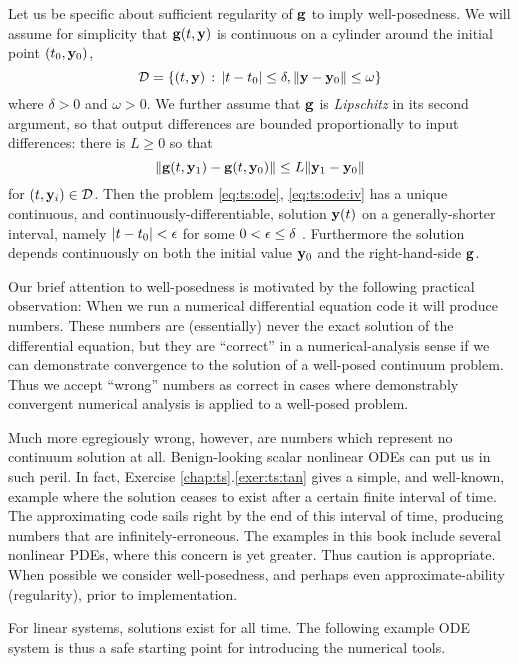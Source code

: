 Let us be specific about sufficient regularity of $\mathbf{g}$ to imply well-posedness.  We will assume for simplicity that $\mathbf{g}(t,\mathbf{y})$ is continuous on a cylinder around the initial point $(t_0,\mathbf{y}_0)$,
   $$\mathcal{D} = \{(t,\mathbf{y}) \,:\, |t-t_0| \le \delta, \|\mathbf{y} - \mathbf{y}_0\| \le \omega\}$$
where $\delta > 0$ and $\omega > 0$.  We further assume that $\mathbf{g}$ is \emph{Lipschitz} in its second argument, so that output differences are bounded proportionally to input differences: there is $L\ge 0$ so that
\begin{equation}
\|\mathbf{g}(t,\mathbf{y}_1) - \mathbf{g}(t,\mathbf{y}_0)\| \le L \|\mathbf{y}_1-\mathbf{y}_0\|  \label{eq:ts:glipschitz}
\end{equation}
for $(t,\mathbf{y}_i) \in \mathcal{D}$.  Then the problem \eqref{eq:ts:ode}, \eqref{eq:ts:ode:iv} has a unique continuous, and continuously-differentiable, solution $\mathbf{y}(t)$ on a generally-shorter interval, namely $|t-t_0|<\epsilon$ for some $0 < \epsilon \le \delta$ \citep[section 17.5]{HirschSmaleDevaney2004}.  Furthermore the solution depends continuously on both the initial value $\mathbf{y}_0$ and the right-hand-side $\mathbf{g}$.

Our brief attention to well-posedness is motivated by the following practical observation:  When we run a numerical differential equation code it will produce numbers.  These numbers are (essentially) never the exact solution of the differential equation, but they are ``correct'' in a numerical-analysis sense if we can demonstrate convergence to the solution of a well-posed continuum problem.  Thus we accept ``wrong'' numbers as correct in cases where demonstrably convergent numerical analysis is applied to a well-posed problem.

Much more egregiously wrong, however, are numbers which represent no continuum solution at all.  Benign-looking scalar nonlinear ODEs can put us in such peril.  In fact, Exercise \ref{chap:ts}.\ref{exer:ts:tan} gives a simple, and well-known, example where the solution ceases to exist after a certain finite interval of time.  The approximating code sails right by the end of this interval of time, producing numbers that are infinitely-erroneous.  The examples in this book include several nonlinear PDEs, where this concern is yet greater.  Thus caution is appropriate.  When possible we consider well-posedness, and perhaps even approximate-ability (regularity), prior to implementation.

For linear systems, solutions exist for all time.  The following example ODE system is thus a safe starting point for introducing the numerical tools.

